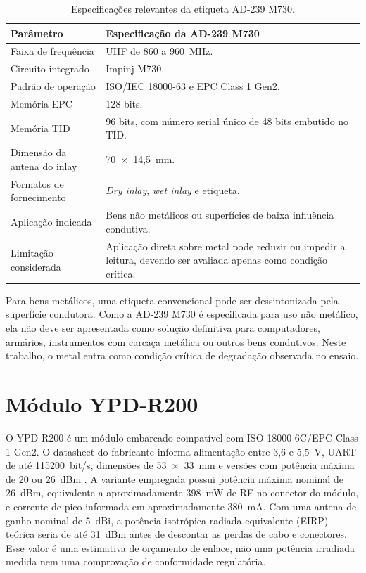 \begin{table}[htbp]
    \centering
    \caption{Especificações relevantes da etiqueta AD-239 M730.}
    \label{tab:ad239m730}
    \footnotesize
    \begin{tabularx}{\textwidth}{p{4.0cm}X}
        \toprule
        \textbf{Parâmetro} & \textbf{Especificação da AD-239 M730} \\
        \midrule
        Faixa de frequência & UHF de 860 a 960~MHz. \\
        Circuito integrado & Impinj M730. \\
        Padrão de operação & ISO/IEC 18000-63 e EPC Class 1 Gen2. \\
        Memória EPC & 128 bits. \\
        Memória TID & 96 bits, com número serial único de 48 bits embutido no TID. \\
        Dimensão da antena do inlay & 70~$\times$~14,5~mm. \\
        Formatos de fornecimento & \textit{Dry inlay}, \textit{wet inlay} e etiqueta. \\
        Aplicação indicada & Bens não metálicos ou superfícies de baixa influência condutiva. \\
        Limitação considerada & Aplicação direta sobre metal pode reduzir ou impedir a leitura, devendo ser avaliada apenas como condição crítica. \\
        \bottomrule
    \end{tabularx}
\end{table}

Para bens metálicos, uma etiqueta convencional pode ser dessintonizada pela superfície condutora. Como a AD-239 M730 é especificada para uso não metálico, ela não deve ser apresentada como solução definitiva para computadores, armários, instrumentos com carcaça metálica ou outros bens condutivos. Neste trabalho, o metal entra como condição crítica de degradação observada no ensaio.

\section{Módulo YPD-R200}

O YPD-R200 é um módulo embarcado compatível com ISO 18000-6C/EPC Class 1 Gen2. O datasheet do fabricante informa alimentação entre 3,6 e 5,5~V, UART de até 115200~bit/s, dimensões de 53~$\times$~33~mm e versões com potência máxima de 20 ou 26~dBm \cite{yanpodo2021r200}. A variante empregada possui potência máxima nominal de 26~dBm, equivalente a aproximadamente 398~mW de RF no conector do módulo, e corrente de pico informada em aproximadamente 380~mA. Com uma antena de ganho nominal de 5~dBi, a potência isotrópica radiada equivalente (EIRP) teórica seria de até 31~dBm antes de descontar as perdas de cabo e conectores. Esse valor é uma estimativa de orçamento de enlace, não uma potência irradiada medida nem uma comprovação de conformidade regulatória.

